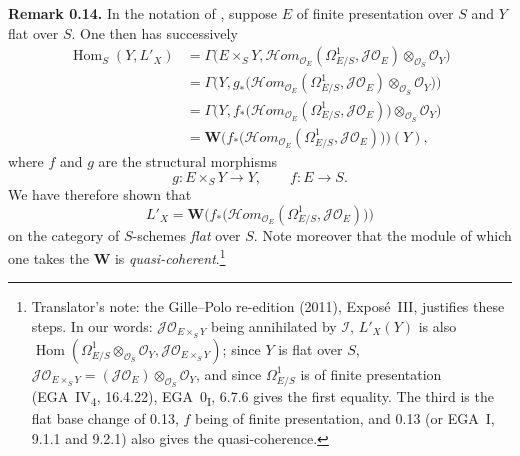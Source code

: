 \medskip
\noindent{}\textbf{Remark 0.14.}
In the notation of , suppose \(E\) of finite presentation over \(S\)
and \(Y\) flat over \(S\). One then has successively
\begin{align*}
 \operatorname{Hom}_S(Y,L'_X)
 &=\Gamma\bigl(E\times_SY,\mathscr{H}om_{\mathscr O_E}
   (\Omega^1_{E/S},\mathscr J\mathscr O_E)\otimes_{\mathscr O_S}\mathscr O_Y\bigr)\\
 &=\Gamma\bigl(Y,g_*\bigl(\mathscr{H}om_{\mathscr O_E}
   (\Omega^1_{E/S},\mathscr J\mathscr O_E)\otimes_{\mathscr O_S}\mathscr O_Y\bigr)\bigr)\\
 &=\Gamma\bigl(Y,f_*\bigl(\mathscr{H}om_{\mathscr O_E}
   (\Omega^1_{E/S},\mathscr J\mathscr O_E)\bigr)\otimes_{\mathscr O_S}\mathscr O_Y\bigr)\\
 &=\mathbf W\bigl(f_*\bigl(\mathscr{H}om_{\mathscr O_E}
   (\Omega^1_{E/S},\mathscr J\mathscr O_E)\bigr)\bigr)(Y),
\end{align*}
where \(f\) and \(g\) are the structural morphisms
\[
 g:E\times_SY\longrightarrow Y,\qquad f:E\longrightarrow S.
\]
We have therefore shown that
\[
 L'_X=\mathbf W\bigl(f_*\bigl(\mathscr{H}om_{\mathscr O_E}
 (\Omega^1_{E/S},\mathscr J\mathscr O_E)\bigr)\bigr)
\]
on the category of \(S\)-schemes \emph{flat} over \(S\). Note moreover that
the module of which one takes the \(\mathbf W\) is
\emph{quasi-coherent}.\footnote{Translator's note: the Gille--Polo re-edition (2011), Exposé~III, justifies these steps. In our
words: \(\mathscr J\mathscr O_{E\times_SY}\) being annihilated by \(\mathscr I\),
\(L'_X(Y)\) is also
\(\operatorname{Hom}(\Omega^1_{E/S}\otimes_{\mathscr O_S}\mathscr O_Y,
\mathscr J\mathscr O_{E\times_SY})\); since \(Y\) is flat over \(S\),
\(\mathscr J\mathscr O_{E\times_SY}=(\mathscr J\mathscr O_E)
\otimes_{\mathscr O_S}\mathscr O_Y\), and since \(\Omega^1_{E/S}\) is of finite
presentation (EGA~IV\textsubscript{4}, 16.4.22), EGA~0\textsubscript{I}, 6.7.6
gives the first equality. The third is the flat base change of 0.13, \(f\)
being of finite presentation, and 0.13 (or EGA~I, 9.1.1 and 9.2.1) also gives
the quasi-coherence.}

